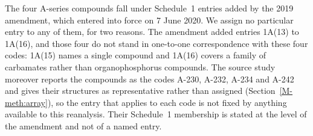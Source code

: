 \documentclass[journal=jacsat,manuscript=suppinfo,margin=1in]{achemso}
\begin{document}
The four A-series compounds fall under Schedule~1 entries added by the 2019
amendment, which entered into force on 7 June 2020.\cite{opcwnovichok} We
assign no particular entry to any of them, for two reasons. The amendment added
entries 1A(13) to 1A(16), and those four do not stand in one-to-one
correspondence with these four codes: 1A(15) names a single compound and
1A(16) covers a family of carbamates rather than organophosphorus compounds.
The source study moreover reports the compounds as the codes
A-230, A-232, A-234 and A-242 and gives their structures as representative
rather than assigned (Section~\ref{M-meth:array}), so the entry that applies to
each code is not fixed by anything available to this reanalysis. Their
Schedule~1 membership is stated at the level of the amendment and not of a
named entry.
\end{document}

